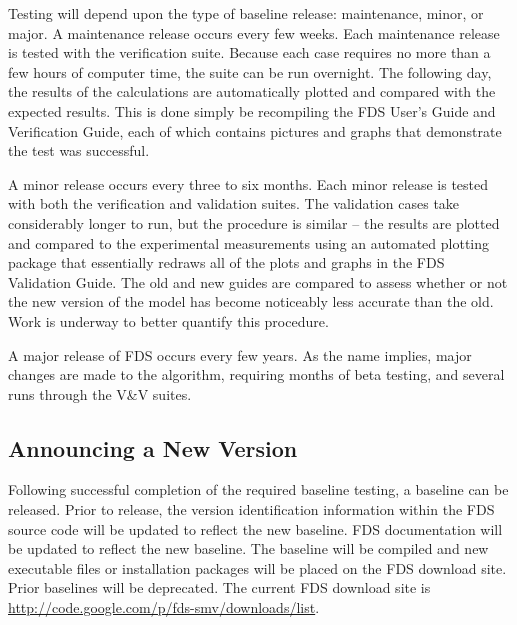\documentclass[11pt]{book}
\newcommand{\nopart}{\expandafter\def\csname Parent-1\endcsname{}} %
\begin{document}
Testing will depend upon the type of baseline release:
maintenance, minor, or major. A maintenance release occurs every few weeks.
Each maintenance release is tested with the verification suite. Because each case requires no more than a few
hours of computer time, the suite can be run overnight. The following day, the results of the calculations are automatically plotted and
compared with the expected results. This is done simply be recompiling the FDS User's Guide and Verification Guide, each of which contains pictures
and graphs that demonstrate the test was successful.

A minor release occurs every three to six months.
Each minor release is tested with both the verification and validation suites. The validation cases take considerably longer to run, but the
procedure is similar -- the results are plotted and compared to the experimental measurements using an automated plotting package that
essentially redraws all of the plots and graphs in the FDS Validation Guide. The old and new guides are compared to assess whether or not
the new version of the model has become noticeably less accurate than the old. Work is underway to better quantify this procedure.

A major release of FDS occurs every few years. As the name implies, major changes are made to the algorithm, requiring months of beta testing, and several
runs through the V\&V suites.


\subsection{Announcing a New Version}

Following successful completion of the required baseline testing, a baseline can be released.  Prior to release, the
version identification information within the FDS source code will be updated to reflect the new baseline.  FDS
documentation will be updated to reflect the new baseline.  The baseline will be compiled and new executable files
or installation packages will be placed on the FDS download site.  Prior baselines will be deprecated.  The
current FDS download site is \href{http://code.google.com/p/fds-smv/downloads/list}
{{\ct http://code.google.com/p/fds-smv/downloads/list}}.





\backmatter
\nopart



\printindex
\end{document}
